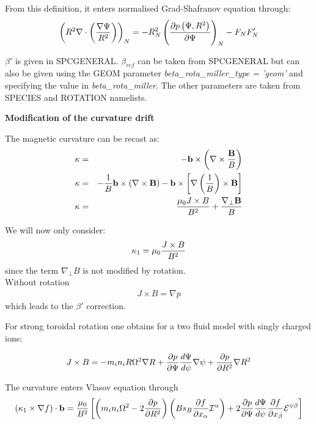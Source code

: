 From this definition, it enters normalised Grad-Shafranov equation through:
\begin{equation}
\left(R^2 \nabla \cdot \left({\nabla \Psi \over R^2}\right)\right)_N = - R_N^2 \left(\frac{\partial  p \left(\Psi,R^2\right)}{\partial \Psi}\right)_N - F_NF_N'
\end{equation}


$\beta'$ is given in SPCGENERAL. $\beta_{ref}$ can be taken from SPCGENERAL but can also be given using the GEOM parameter \textit{beta\_rota\_miller\_type = 'geom'} and specifying the value in \textit{beta\_rota\_miller}. The other parameters are taken from SPECIES and ROTATION namelists.


\textbf{Modification of the curvature drift}

The magnetic curvature can be recast as:
\begin{eqnarray}
\kappa &=& - \mathbf b \times \left(\nabla \times {\mathbf B \over B} \right) \\
\kappa &=& - {1 \over B} \mathbf{b}\times \left(\nabla \times \mathbf{B}\right) - \mathbf{b} \times \left[\nabla\left({1 \over B}\right) \times \mathbf{B}\right] \\
\kappa &=& {\mu_0 J\times B \over B^2}+{\nabla_\bot \mathbf B \over B} \\
\end{eqnarray}

We will now only consider:
\begin{align}
\kappa_1 = \mu_0 {J \times B \over B^2}
\end{align}
since the term $\nabla_\bot B$ is not modified by rotation.\\

Without rotation 
\begin{align}
J\times B = \nabla p
\end{align}
which leads to the $\beta'$ correction.

For strong toroidal rotation one obtains for a two fluid model with singly charged ions:

\begin{align}
J\times B = -m_in_iR\Omega^2\nabla R + \frac{\partial  p}{\partial \Psi} {d \Psi \over d \psi}\nabla \psi + \frac{\partial  p}{\partial R^2} \nabla R^2
\end{align}

The curvature enters Vlasov equation through
\begin{align}
\left(\kappa_1 \times \nabla f\right)\cdot \mathbf{b} = {\mu_0 \over B^2}\left[\left(m_in_i\Omega ^2-2\frac{\partial  p}{\partial R^2}\right) \left(Bs_B\frac{\partial  f}{\partial x_\alpha}\mathcal{I}^\alpha\right)+2\frac{\partial  p}{\partial \Psi}{d \Psi \over d \psi} \frac{\partial  f}{\partial x_\beta} \mathcal{E}^{\psi \beta}\right]
\end{align}


